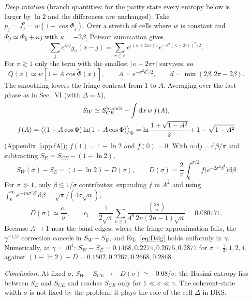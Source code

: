 \documentclass[aps,pra,onecolumn,notitlepage,nofootinbib,11pt]{revtex4-2}
\newcommand{\dd}{\mathrm{d}}
\begin{document}
\emph{Deep rotation} (branch quantities; for the parity state every entropy below is
larger by $\ln2$ and the differences are unchanged). Take $p_{j}=J_{j}^{2}=w(1+\cos\Phi_{j})$. Over a stretch of cells where $w$
is constant and $\Phi_{j}\simeq\Phi_{0}+\kappa j$ with $\kappa=-2\beta$, Poisson summation gives
\begin{equation}
\sum_{j}e^{i\kappa j}g_{\sigma}(x-j)=\sum_{r\in\mathbb{Z}}e^{i(\kappa+2\pi r)x}e^{-\sigma^{2}(\kappa+2\pi r)^{2}/2}.
\end{equation}
For $\sigma\gtrsim1$ only the term with the smallest $|\kappa+2\pi r|$ survives, so
\begin{equation}
Q(x)\simeq w\left[1+A\cos\tilde\Phi(x)\right],\qquad A=e^{-\sigma^{2}d^{2}/2},\qquad
d=\min(2\beta,2\pi-2\beta).
\end{equation}
The smoothing lowers the fringe contrast from $1$ to $A$. Averaging over the fast phase
as in Sec.~VI (with $\Delta=h$),
\begin{gather}
S_{W}\simeq S_{CE}^{\rm branch}-\int\dd x\,w\,f(A),\\
f(A)=\big\langle(1+A\cos\Phi)\ln(1+A\cos\Phi)\big\rangle_{\Phi}
=\ln\frac{1+\sqrt{1-A^{2}}}{2}+1-\sqrt{1-A^{2}}
\end{gather}
(Appendix~\ref{app:fA}); $f(1)=1-\ln2$ and $f(0)=0$. With $w\,\dd j=\dd\beta/\pi$ and subtracting
$S_{E}=S_{CE}-(1-\ln2)$,
\begin{equation}
\boxed{\;S_{W}(\sigma)-S_{E}=(1-\ln2)-D(\sigma),\qquad
D(\sigma)=\frac{2}{\pi}\int_{0}^{\pi/2}f\big(e^{-2\sigma^{2}\beta^{2}}\big)\dd\beta\;}
\label{eq:Dsig}
\end{equation}
For $\sigma\gg1$, only $\beta\lesssim1/\sigma$ contributes; expanding $f$ in $A^{2}$ and using
$\int_{0}^{\infty}e^{-4n\sigma^{2}\beta^{2}}\dd\beta=\sqrt\pi/(4\sigma\sqrt n)$,
\begin{equation}
D(\sigma)\simeq\frac{c_{1}}{\sigma},\qquad
c_{1}=\frac{1}{2\sqrt\pi}\sum_{n\ge1}\frac{\binom{2n}{n}}{4^{n}\,2n(2n-1)\sqrt n}=0.080171 .
\end{equation}
Because $A\to1$ near the band edges, where the fringe approximation fails, the
$\gamma^{-1/3}$ correction cancels in $S_{W}-S_{E}$, and Eq.~\eqref{eq:Dsig} holds uniformly in
$\gamma$. Numerically, at $\gamma=10^{4}$: $S_{W}-S_{E}=0.1468,0.2274,0.2675,0.2877$ for
$\sigma=\frac12,1,2,4$, against $(1-\ln2)-D=0.1502,0.2267,0.2668,0.2868$.

\emph{Conclusion.} At fixed $\sigma$, $S_{W}-S_{CE}\to-D(\sigma)\simeq-0.08/\sigma$: the Husimi
entropy lies between $S_{E}$ and $S_{CE}$ and reaches $S_{CE}$ only for $1\ll\sigma\ll\gamma$. The
coherent-state width $\sigma$ is not fixed by the problem; it plays the role of the cell
$\Delta$ in DKS.
\end{document}

